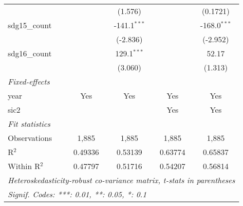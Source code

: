 \begin{tabular}{lcccc}
                     &                  & (1.576)          &                  & (0.1721)\\   
   sdg15\_count      &                  & -141.1$^{***}$   &                  & -168.0$^{***}$\\   
                     &                  & (-2.836)         &                  & (-2.952)\\   
   sdg16\_count      &                  & 129.1$^{***}$    &                  & 52.17\\   
                     &                  & (3.060)          &                  & (1.313)\\   
   \midrule
   \emph{Fixed-effects}\\
   year              & Yes              & Yes              & Yes              & Yes\\  
   sic2              &                  &                  & Yes              & Yes\\  
   \midrule
   \emph{Fit statistics}\\
   Observations      & 1,885            & 1,885            & 1,885            & 1,885\\  
   R$^2$             & 0.49336          & 0.53139          & 0.63774          & 0.65837\\  
   Within R$^2$      & 0.47797          & 0.51716          & 0.54207          & 0.56814\\  
   \midrule \midrule
   \multicolumn{5}{l}{\emph{Heteroskedasticity-robust co-variance matrix, t-stats in parentheses}}\\
   \multicolumn{5}{l}{\emph{Signif. Codes: ***: 0.01, **: 0.05, *: 0.1}}\\
\end{tabular}
\par\endgroup


